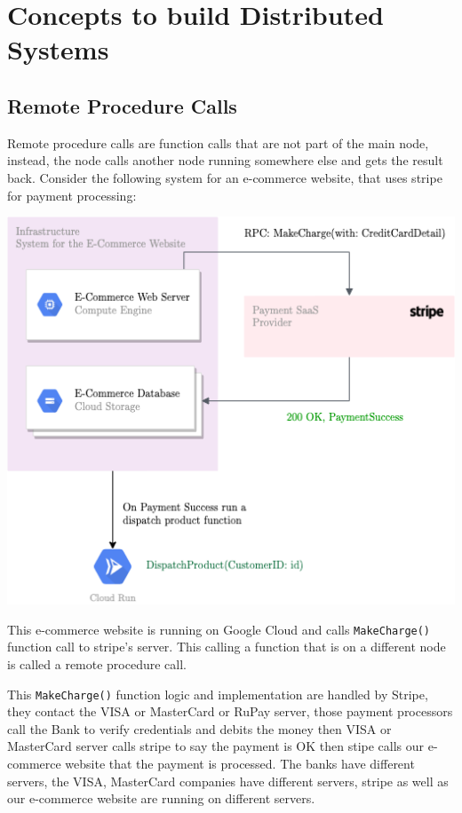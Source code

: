 \chapter{Concepts to build Distributed Systems}

\section{Remote Procedure Calls}
Remote procedure calls are function calls that are not part of the main node, instead, the node calls another node running somewhere else and gets the result back. Consider the following system for an e-commerce website, that uses stripe for payment processing:

\includegraphics[scale=0.60]{images/RPC.png}

\noindent This e-commerce website is running on Google Cloud and calls \texttt{MakeCharge()} function call to stripe's server. This calling a function that is on a different node is called a remote procedure call.

\noindent This \texttt{MakeCharge()} function logic and implementation are handled by Stripe, they contact the VISA or MasterCard or RuPay server, those payment processors call the Bank to verify credentials and debits the money then VISA or MasterCard server calls stripe to say the payment is OK then stipe calls our e-commerce website that the payment is processed. The banks have different servers, the VISA, MasterCard companies have different servers, stripe as well as our e-commerce website are running on different servers.

